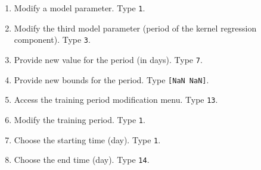 \begin{enumerate}
\item Modify a model parameter. Type \colorbox{light-gray}{\lstinline[basicstyle = \mlttfamily \small, backgroundcolor = \color{light-gray}]!1!}.
\item Modify the third model parameter (period of the kernel regression component). Type \colorbox{light-gray}{\lstinline[basicstyle = \mlttfamily \small, backgroundcolor = \color{light-gray}]!3!}.
\item Provide new value for  the period (in days). Type \colorbox{light-gray}{\lstinline[basicstyle = \mlttfamily \small, backgroundcolor = \color{light-gray}]!7!}.
\item Provide new bounds for the period. Type \colorbox{light-gray}{\lstinline[basicstyle = \mlttfamily \small, backgroundcolor = \color{light-gray}]![NaN NaN]!}.

\item Access the training period modification menu. Type \colorbox{light-gray}{\lstinline[basicstyle = \mlttfamily \small, backgroundcolor = \color{light-gray}]!13!}. 

\item Modify the training period. Type \colorbox{light-gray}{\lstinline[basicstyle = \mlttfamily \small, backgroundcolor = \color{light-gray}]!1!}. 

\item Choose the starting time (day). Type \colorbox{light-gray}{\lstinline[basicstyle = \mlttfamily \small, backgroundcolor = \color{light-gray}]!1!}. 

\item Choose the end time (day). Type \colorbox{light-gray}{\lstinline[basicstyle = \mlttfamily \small, backgroundcolor = \color{light-gray}]!14!}. 


\end{enumerate}
